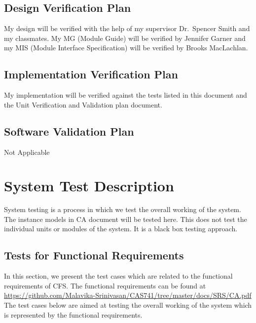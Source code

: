 \documentclass[12pt, titlepage]{article}
\newcommand{\famname}{CFS} %
\begin{document}
\subsection{Design Verification Plan}

My design will be verified with the help of my supervisor Dr.\ Spencer Smith and
my classmates. My MG (Module Guide) will be verified by Jennifer Garner and my 
MIS (Module Interface Specification) will be verified by Brooks MacLachlan.

\subsection{Implementation Verification Plan}

My implementation will be verified against the tests listed in this document 
and the Unit Verification and Validation plan document. 

\subsection{Software Validation Plan}

Not Applicable 

\section{System Test Description}

System testing is a process in which we test the overall working of the system. The instance models in CA document will be tested here. This does not test the individual units or modules of the system. It is a black box testing approach.
	
\subsection{Tests for Functional Requirements}\label{FuncReq}

In this section, we present the test cases which are related to the functional 
requirements of \famname{}. The functional requirements can be found at \sloppy
\url{https://github.com/Malavika-Srinivasan/CAS741/tree/master/docs/SRS/CA.pdf} 
The test cases below are aimed at testing the overall working of the system 
which is represented by the functional requirements. 
\end{document}

